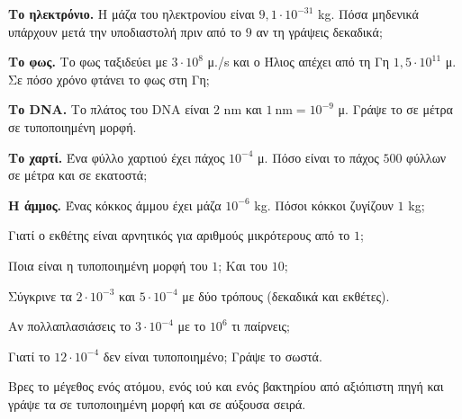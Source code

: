 \ex \textbf{Το ηλεκτρόνιο.} Η μάζα του ηλεκτρονίου είναι $9{,}1\cdot10^{-31}$ kg. Πόσα μηδενικά υπάρχουν μετά την υποδιαστολή πριν από το $9$ αν τη γράψεις δεκαδικά;

\ex \textbf{Το φως.} Το φως ταξιδεύει με $3\cdot10^{8}$ μ./s και ο Ήλιος απέχει από τη Γη $1{,}5\cdot10^{11}$ μ. Σε πόσο χρόνο φτάνει το φως στη Γη;

\ex \textbf{Το DNA.} Το πλάτος του DNA είναι $2$ nm και $1\ \mathrm{nm}=10^{-9}$ μ. Γράψε το σε μέτρα σε τυποποιημένη μορφή.

\ex \textbf{Το χαρτί.} Ένα φύλλο χαρτιού έχει πάχος $10^{-4}$ μ. Πόσο είναι το πάχος $500$ φύλλων σε μέτρα και σε εκατοστά;

\ex \textbf{Η άμμος.} Ένας κόκκος άμμου έχει μάζα $10^{-6}$ kg. Πόσοι κόκκοι ζυγίζουν $1$ kg;


\ex Γιατί ο εκθέτης είναι αρνητικός για αριθμούς μικρότερους από το $1$;

\ex Ποια είναι η τυποποιημένη μορφή του $1$; Και του $10$;

\ex Σύγκρινε τα $2\cdot10^{-3}$ και $5\cdot10^{-4}$ με δύο τρόπους (δεκαδικά και εκθέτες).

\ex Αν πολλαπλασιάσεις το $3\cdot10^{-4}$ με το $10^{6}$ τι παίρνεις;

\ex Γιατί το $12\cdot10^{-4}$ δεν είναι τυποποιημένο; Γράψε το σωστά.


\ex Βρες το μέγεθος ενός ατόμου, ενός ιού και ενός βακτηρίου από αξιόπιστη πηγή και γράψε τα σε τυποποιημένη μορφή και σε αύξουσα σειρά.
